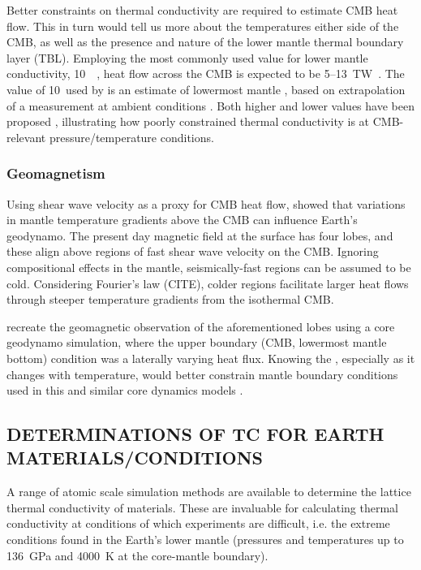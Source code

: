 Better constraints on thermal conductivity are required to estimate CMB heat flow. This in turn would tell us more about the temperatures either side of the CMB, as well as the presence and nature of the lower mantle thermal boundary layer (TBL). Employing the most commonly used value for lower mantle conductivity, 10~\wmk~\citep{Lay2008}, heat flow across the CMB is expected to be 5--13~TW~\citep{Lay2008}. The value of 10~\wmks used by \citet{Lay2006} is an estimate of lowermost mantle \tc, based on extrapolation of a measurement at ambient conditions \citep{Osako1991}. Both higher and lower values have been proposed \citep[4--16~\wmk,][]{Manthilake2011}, illustrating how poorly constrained thermal conductivity is at CMB-relevant pressure/temperature conditions.

\subsubsection{Geomagnetism}

Using shear wave velocity as a proxy for CMB heat flow, \citet{Gubbins2007} showed that variations in mantle temperature gradients above the CMB can influence Earth's geodynamo. The present day magnetic field at the surface has four lobes, and these align above regions of fast shear wave velocity on the CMB. Ignoring compositional effects in the mantle, seismically-fast regions can be assumed to be cold. Considering Fourier's law (CITE), colder regions facilitate larger heat flows through steeper temperature gradients from the isothermal CMB.

\citet{Gubbins2007} recreate the geomagnetic observation of the aforementioned lobes using a core geodynamo simulation, where the upper boundary (CMB, lowermost mantle bottom) condition was a laterally varying heat flux. Knowing the \tc, especially as it changes with temperature, would better constrain mantle boundary conditions used in this and similar core dynamics models \citep{Ammann2014}.



\subsection{DETERMINATIONS OF TC FOR EARTH MATERIALS/CONDITIONS}

A range of atomic scale simulation methods are available to determine the lattice thermal conductivity of materials. These are invaluable for calculating thermal conductivity at conditions of which experiments are difficult, i.e. the extreme conditions found in the Earth's lower mantle (pressures and temperatures up to 136~GPa and 4000~K at the core-mantle boundary). 

